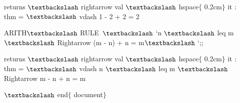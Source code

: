 \documentclass[12pt]{article}
\renewcommand{\_}{\kern-1.5pt\textunderscore\kern-1.5pt}
\begin{document}
\vspace{\baselineskip}
\begin{FlushLeft}
{\fontsize{14pt}{16.8pt}\selectfont returns $\textbackslash$ rightarrow val $\textbackslash$ hspace$ \{ $ 0.2cm$ \} $  it : thm = $\textbackslash$ vdash 1 - 2 + 2 = 2\par}
\end{FlushLeft}\par


\vspace{\baselineskip}
\begin{FlushLeft}
{\fontsize{14pt}{16.8pt}\selectfont ARITH$\textbackslash$ \_RULE\ $\textbackslash$ `n $\textbackslash$ leq m $\textbackslash$ Rightarrow  (m - n) + n = m$\textbackslash$ `;;\par}
\end{FlushLeft}\par


\vspace{\baselineskip}
\begin{FlushLeft}
{\fontsize{14pt}{16.8pt}\selectfont returns $\textbackslash$ rightarrow val $\textbackslash$ hspace$ \{ $ 0.2cm$ \} $  it : thm = $\textbackslash$ vdash n $\textbackslash$ leq m $\textbackslash$ Rightarrow m - n + n = m\par}
\end{FlushLeft}\par


\vspace{\baselineskip}

\vspace{\baselineskip}

\vspace{\baselineskip}

\vspace{\baselineskip}

\vspace{\baselineskip}

\vspace{\baselineskip}

\vspace{\baselineskip}
\begin{FlushLeft}
{\fontsize{14pt}{16.8pt}\selectfont $\textbackslash$ end$ \{ $ document$ \} $ \par}
\end{FlushLeft}\par


\printbibliography
\end{document}
